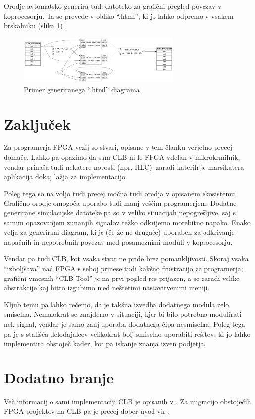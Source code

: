 \documentclass[a4paper]{article}
\begin{document}
\begin{sloppypar}
Orodje avtomatsko generira tudi datoteko za grafični pregled povezav v
koprocesorju. Ta se prevede v obliko ``.html'', ki jo lahko odpremo v vsakem
brskalniku (slika \ref{fig:clbtool_diagram}) \cite[Pogl.~1]{clb-user-guide}.

\begin{figure}[htb]
    \centerline{\includegraphics[width=8cm]{html_diagram}}
    \caption{Primer generiranega ``.html'' diagrama}
    \label{fig:clbtool_diagram} 
\end{figure} 


\section{Zaključek}
Za programerja FPGA vezij so stvari, opisane v tem članku verjetno precej
domače. Lahko pa opazimo da sam CLB ni le FPGA vdelan v mikrokrmilnik, vendar
prinaša tudi nekatere novosti (npr. HLC), zaradi katerih je marsikatera
aplikacija dokaj lažja za implementacijo.

Poleg tega so na voljo tudi precej močna tudi orodja v opisanem ekosistemu.
Grafično orodje omogoča uporabo tudi manj veščim programerjem. Dodatne
generirane simulacijske datoteke pa so v veliko situacijah nepogrešljive, saj s
samim opazovanjem zunanjih signalov težko odkrijemo morebitno napako. Enako
velja za generirani diagram, ki je (če že ne drugače) uporaben za odkrivanje
napačnih in nepotrebnih povezav med posameznimi moduli v koprocesorju.

Vendar pa tudi CLB, kot vsaka stvar ne pride brez pomankljivosti. Skoraj vsaka
``izboljšava'' nad FPGA s seboj prinese tudi kakšno frustracijo za programerja;
grafični vmesnih ``CLB Tool'' je na prvi pogled res prijazen, a se zaradi
velike abstrakcije kaj hitro izgubimo med neštetimi nastavitvenimi meniji.

Kljub temu pa lahko rečemo, da je takšna izvedba dodatnega modula zelo
smiselna. Nemalokrat se znajdemo v situaciji, kjer bi bilo potrebno modulirati
nek signal, vendar je samo zanj uporaba dodatnega čipa nesmiselna. Poleg tega
pa je s stališča delodajalcev velikokrat bolj smiselno uporabiti rešitev, ki jo
lahko implementira obstoječ kader, kot pa iskanje znanja izven podjetja.

\section{Dodatno branje}
Več informacij o sami implementaciji CLB je opisanih v \cite{clb-designing}. Za
migracijo obstoječih FPGA projektov na CLB pa je precej dober uvod vir
\cite{fpga-to-clb}.


\printbibliography


\end{sloppypar}
\end{document}
